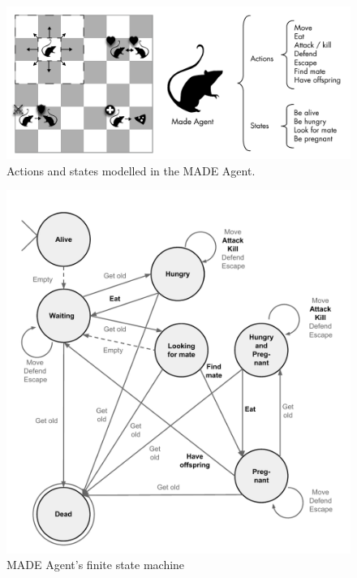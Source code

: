 \documentclass{sig-alternate}
\begin{document}
\begin{figure}
\begin{center}
\includegraphics[scale=0.65]{img/MadeAgent.pdf}
\caption{Actions and states modelled in the MADE Agent.}
\label{fig:madeAgent}
\end{center}
\end{figure}

\begin{figure}
\begin{center}
\includegraphics[scale=0.65]{img/fsm.pdf}
\caption{MADE Agent's finite state machine}
\label{fig:fsm}
\end{center}
\end{figure}
\end{document}
